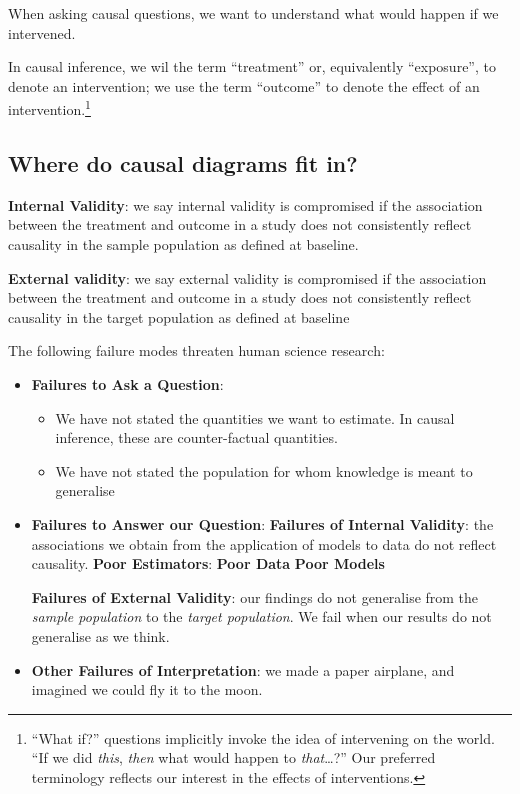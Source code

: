 \documentclass[
  single column]{article}
\providecommand{\tightlist}{%
  \setlength{\itemsep}{0pt}\setlength{\parskip}{0pt}}\usepackage{longtable,booktabs,array}
\begin{document}
When asking causal questions, we want to understand what would happen if
we intervened.

In causal inference, we wil the term ``treatment'' or, equivalently
``exposure'', to denote an intervention; we use the term ``outcome'' to
denote the effect of an intervention.\footnote{``What if?'' questions
  implicitly invoke the idea of intervening on the world. ``If we did
  \emph{this}, \emph{then} what would happen to \emph{that}\ldots?'' Our
  preferred terminology reflects our interest in the effects of
  interventions.}

\subsection{Where do causal diagrams fit
in?}\label{where-do-causal-diagrams-fit-in}

\textbf{Internal Validity}: we say internal validity is compromised if
the association between the treatment and outcome in a study does not
consistently reflect causality in the sample population as defined at
baseline.

\textbf{External validity}: we say external validity is compromised if
the association between the treatment and outcome in a study does not
consistently reflect causality in the target population as defined at
baseline

The following failure modes threaten human science research:

\begin{itemize}
\item
  \textbf{Failures to Ask a Question}:

  \begin{itemize}
  \tightlist
  \item
    We have not stated the quantities we want to estimate. In causal
    inference, these are counter-factual quantities.
  \item
    We have not stated the population for whom knowledge is meant to
    generalise
  \end{itemize}
\item
  \textbf{Failures to Answer our Question}: \textbf{Failures of Internal
  Validity}: the associations we obtain from the application of models
  to data do not reflect causality. \textbf{Poor Estimators}:
  \textbf{Poor Data} \textbf{Poor Models}

  \textbf{Failures of External Validity}: our findings do not generalise
  from the \emph{sample population} to the \emph{target population}. We
  fail when our results do not generalise as we think.
\item
  \textbf{Other Failures of Interpretation}: we made a paper airplane,
  and imagined we could fly it to the moon.
\end{itemize}
\end{document}
